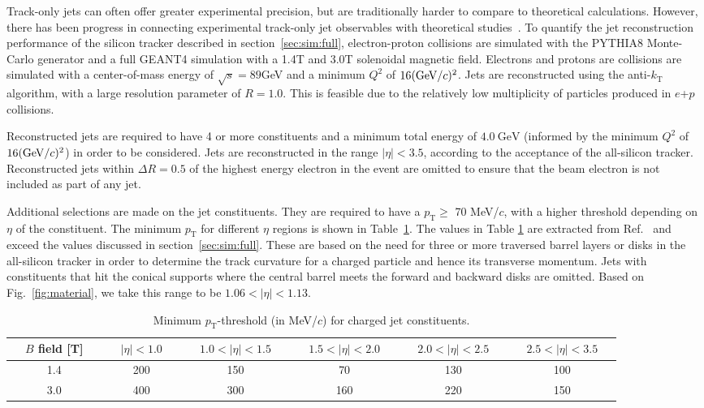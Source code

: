 Track-only jets can often offer greater experimental precision, but are traditionally harder to compare to theoretical calculations. However, there has been progress in connecting experimental track-only jet observables with theoretical studies~\cite{PhysRevD.88.034030}. To quantify the jet reconstruction performance of the silicon tracker described in section~\ref{sec:sim:full}, electron-proton collisions are simulated with the PYTHIA8 Monte-Carlo generator and a full GEANT4 simulation with a 1.4T and 3.0T solenoidal magnetic field. Electrons and protons are collisions are simulated with a center-of-mass energy of $\sqrt{s}=89$GeV and a minimum $Q^2$ of  $16(\mathrm{GeV}/c)^2$. Jets are reconstructed using the anti-$k_\mathrm{T}$ algorithm, with a large resolution parameter of $R= 1.0$. This is feasible due to the relatively low multiplicity of particles produced in $e$+$p$ collisions. 

Reconstructed jets are required to have 4 or more constituents and a minimum total energy of $4.0~\mathrm{GeV}$ (informed by the minimum $Q^2$ of $16(\mathrm{GeV}/c)^2$) in order to be considered. Jets are reconstructed in the range $|\eta|<3.5$, according to the acceptance of the all-silicon tracker. Reconstructed jets within $\Delta R = 0.5$ of the highest energy electron in the event are omitted to ensure that the beam electron is not included as part of any jet.

Additional selections are made on the jet constituents. They are required to have a $p_\mathrm{T} \geq$ 70 MeV/$c$, with a higher threshold depending on $\eta$ of the constituent. The minimum $p_\mathrm{T}$ for different $\eta$ regions is shown in Table~\ref{tab:min_pt1}. The values in Table \ref{tab:min_pt1} are extracted from Ref.~\cite{DMtable:2020} and exceed the values discussed in section~\ref{sec:sim:full}. These are based on the need for three or more traversed barrel layers or disks in the all-silicon tracker in order to determine the track curvature for a charged particle and hence its transverse momentum. Jets with constituents that hit the conical supports where the central barrel meets the forward and backward disks are omitted. Based on Fig.~\ref{fig:material}, we take this range to be $1.06 < |\eta| < 1.13$.

\begin{table}[htb]
\caption{Minimum $p_\mathrm{T}$-threshold (in MeV/$c$) for charged jet constituents.}
\begin{tabular}{  c | c | c | c | c | c  }
~~$B$ field [T]~~& ~~$ |\eta| < 1.0 $~~ & ~~$ 1.0 < |\eta| < 1.5  $~~ & ~~$1.5 < |\eta| < 2.0 $~~ & ~~$ 2.0 < |\eta| < 2.5 $~~ & ~~$2.5 < |\eta| < 3.5$~~\\
\hline \hline
1.4 & 200 & 150 & 70  & 130  & 100 \\
3.0 & 400 & 300 & 160  & 220  & 150 \\
\end{tabular}
\label{tab:min_pt1}
\end{table}

